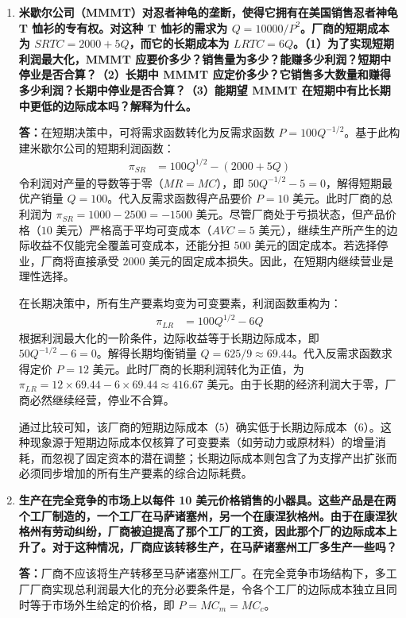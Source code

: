 \begin{enumerate}[label=\textbf{\arabic*.}, leftmargin=*]
		\item \textbf{米歇尔公司（MMMT）对忍者神龟的垄断，使得它拥有在美国销售忍者神龟 T 恤衫的专有权。对这种 T 恤衫的需求为 $Q = 10000 / P^2$。厂商的短期成本为 $SRTC = 2000 + 5Q$，而它的长期成本为 $LRTC = 6Q$。（1）为了实现短期利润最大化，MMMT 应要价多少？销售量为多少？能赚多少利润？短期中停业是否合算？（2）长期中 MMMT 应定价多少？它销售多大数量和赚得多少利润？长期中停业是否合算？（3）能期望 MMMT 在短期中有比长期中更低的边际成本吗？解释为什么。}
		
		\textbf{答：}在短期决策中，可将需求函数转化为反需求函数 $P = 100Q^{-1/2}$。基于此构建米歇尔公司的短期利润函数：
		\[
		\begin{aligned}
			\pi_{SR} &= 100Q^{1/2} - (2000 + 5Q)
		\end{aligned}
		\]
		令利润对产量的导数等于零（$MR = MC$），即 $50Q^{-1/2} - 5 = 0$，解得短期最优产销量 $Q = 100$。代入反需求函数得产品要价 $P = 10$ 美元。此时厂商的总利润为 $\pi_{SR} = 1000 - 2500 = -1500$ 美元。尽管厂商处于亏损状态，但产品价格（$10$ 美元）严格高于平均可变成本（$AVC = 5$ 美元），继续生产所产生的边际收益不仅能完全覆盖可变成本，还能分担 $500$ 美元的固定成本。若选择停业，厂商将直接承受 $2000$ 美元的固定成本损失。因此，在短期内继续营业是理性选择。
		
		在长期决策中，所有生产要素均变为可变要素，利润函数重构为：
		\[
		\begin{aligned}
			\pi_{LR} &= 100Q^{1/2} - 6Q
		\end{aligned}
		\]
		根据利润最大化的一阶条件，边际收益等于长期边际成本，即 $50Q^{-1/2} - 6 = 0$。解得长期均衡销量 $Q = 625/9 \approx 69.44$。代入反需求函数求得定价 $P = 12$ 美元。此时厂商的长期利润转化为正值，为 $\pi_{LR} = 12 \times 69.44 - 6 \times 69.44 \approx 416.67$ 美元。由于长期的经济利润大于零，厂商必然继续经营，停业不合算。
		
		通过比较可知，该厂商的短期边际成本（$5$）确实低于长期边际成本（$6$）。这种现象源于短期边际成本仅核算了可变要素（如劳动力或原材料）的增量消耗，而忽视了固定资本的潜在调整；长期边际成本则包含了为支撑产出扩张而必须同步增加的所有生产要素的综合边际耗费。
		
		\item \textbf{生产在完全竞争的市场上以每件 10 美元价格销售的小器具。这些产品是在两个工厂制造的，一个工厂在马萨诸塞州，另一个在康涅狄格州。由于在康涅狄格州有劳动纠纷，厂商被迫提高了那个工厂的工资，因此那个厂的边际成本上升了。对于这种情况，厂商应该转移生产，在马萨诸塞州工厂多生产一些吗？}
		
		\textbf{答：}厂商不应该将生产转移至马萨诸塞州工厂。在完全竞争市场结构下，多工厂厂商实现总利润最大化的充分必要条件是，令各个工厂的边际成本独立且同时等于市场外生给定的价格，即 $P = MC_{m} = MC_{c}$。
		

\end{enumerate}
